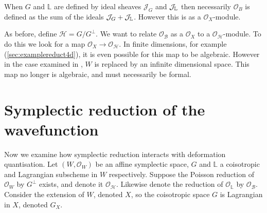    When \(G\) and \( \mathbb{L}\) are defined by ideal sheaves \( \mathcal{J}_G\) and \(\mathcal{J}_{\mathbb{L}}\) then necessarily \( \mathcal{O}_B\) is defined as the sum of the ideals \( \mathcal{J}_G + \mathcal{J}_{\mathbb{L}}\). However this is as a \( \mathcal{O}_X\)-module.
    
    As before, define \( \mathcal{H} = G/G^{\perp}\). We want to relate \( \mathcal{O}_\mathcal{B}\) as a \( \mathcal{O}_X\) to a \( \mathcal{O}_{\mathcal{H}}\)-module. To do this we look for a map \( \mathcal{O}_X \rightarrow \mathcal{O}_{\mathcal{H}} \). In finite dimensions, for example (\ref{sec:examplereduct4d}), it is even possible for this map to be algebraic. However in the case examined in \cite{chaimanowong2020airy}, \( W\) is replaced by an infinite dimensional space. This map no longer is algebraic, and must necessarily be formal.
    
    


    \section{Symplectic reduction of the wavefunction}
    \label{section:wavefunction_reduction}
    
    Now we examine how symplectic reduction interacts with deformation quantisation.  Let \( (W,\mathcal{O}_W)\) be an affine symplectic space, \(G\) and \( \mathbb{L}\) a coisotropic and Lagrangian subscheme in \(W\) respectively. Suppose the Poisson reduction of \( \mathcal{O}_W\) by \(G^{\perp}\) exists, and denote it \( \mathcal{O}_{\mathcal{H}}\). Likewise denote the reduction of \( \mathcal{O}_{\mathbb{L}}\) by \( \mathcal{O}_{\mathcal{B}}\). Consider the extension of \(W\), denoted \(X\), so the coisotropic space \(G\) is Lagrangian in \(X\), denoted \(G_X\).
    
